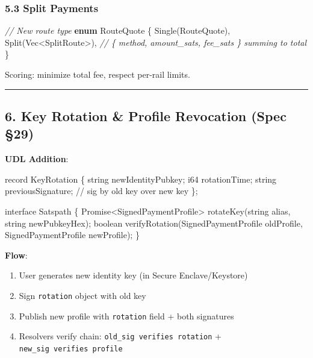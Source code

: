 \documentclass[
]{article}
\newenvironment{Shaded}{}{}
\newcommand{\CommentTok}[1]{\textcolor[rgb]{0.38,0.63,0.69}{\textit{#1}}}
\newcommand{\DataTypeTok}[1]{\textcolor[rgb]{0.56,0.13,0.00}{#1}}
\newcommand{\KeywordTok}[1]{\textcolor[rgb]{0.00,0.44,0.13}{\textbf{#1}}}
\newcommand{\NormalTok}[1]{#1}
\newcommand{\OperatorTok}[1]{\textcolor[rgb]{0.40,0.40,0.40}{#1}}
\providecommand{\tightlist}{%
  \setlength{\itemsep}{0pt}\setlength{\parskip}{0pt}}
\begin{document}
\hypertarget{split-payments}{%
\subsubsection{5.3 Split Payments}\label{split-payments}}

\begin{Shaded}
\begin{Highlighting}[]
\CommentTok{// New route type}
\KeywordTok{enum}\NormalTok{ RouteQuote }\OperatorTok{\{}
\NormalTok{    Single(RouteQuote)}\OperatorTok{,}
\NormalTok{    Split(}\DataTypeTok{Vec}\OperatorTok{\textless{}}\NormalTok{SplitRoute}\OperatorTok{\textgreater{}}\NormalTok{)}\OperatorTok{,}  \CommentTok{// \{ method, amount\_sats, fee\_sats \} summing to total}
\OperatorTok{\}}
\end{Highlighting}
\end{Shaded}

Scoring: minimize total fee, respect per-rail limits.

\begin{center}\rule{0.5\linewidth}{0.5pt}\end{center}

\hypertarget{key-rotation-profile-revocation-spec-29}{%
\subsection{6. Key Rotation \& Profile Revocation (Spec
§29)}\label{key-rotation-profile-revocation-spec-29}}

\textbf{UDL Addition}:

\begin{Shaded}
\begin{Highlighting}[]
\NormalTok{record KeyRotation \{}
\NormalTok{    string newIdentityPubkey;}
\NormalTok{    i64 rotationTime;}
\NormalTok{    string previousSignature;  // sig by old key over new key}
\NormalTok{\};}

\NormalTok{interface Satspath \{}
\NormalTok{    Promise\textless{}SignedPaymentProfile\textgreater{} rotateKey(string alias, string newPubkeyHex);}
\NormalTok{    boolean verifyRotation(SignedPaymentProfile oldProfile, SignedPaymentProfile newProfile);}
\NormalTok{\}}
\end{Highlighting}
\end{Shaded}

\textbf{Flow}:

\begin{enumerate}
\def\labelenumi{\arabic{enumi}.}
\tightlist
\item
  User generates new identity key (in Secure Enclave/Keystore)
\item
  Sign \texttt{rotation} object with old key
\item
  Publish new profile with \texttt{rotation} field + both signatures
\item
  Resolvers verify chain: \texttt{old\_sig\ verifies\ rotation} +
  \texttt{new\_sig\ verifies\ profile}
\end{enumerate}
\end{document}
